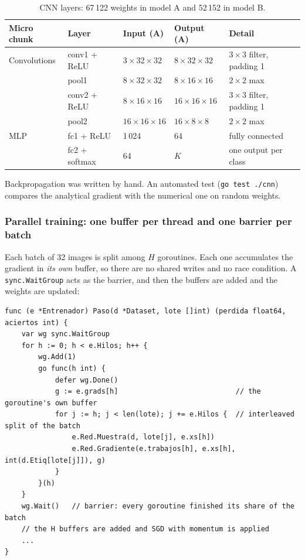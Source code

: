 \documentclass[10pt,a4paper]{article}
\begin{document}
\begin{table}[H]
\centering
\small
\begin{tabular}{lllll}
\toprule
\textbf{Micro chunk} & \textbf{Layer} & \textbf{Input (A)} & \textbf{Output (A)} & \textbf{Detail} \\
\midrule
Convolutions & conv1 + ReLU & $3 \times 32 \times 32$ & $8 \times 32 \times 32$ & $3 \times 3$ filter, padding 1 \\
 & pool1 & $8 \times 32 \times 32$ & $8 \times 16 \times 16$ & $2 \times 2$ max \\
 & conv2 + ReLU & $8 \times 16 \times 16$ & $16 \times 16 \times 16$ & $3 \times 3$ filter, padding 1 \\
 & pool2 & $16 \times 16 \times 16$ & $16 \times 8 \times 8$ & $2 \times 2$ max \\
MLP & fc1 + ReLU & 1\,024 & 64 & fully connected \\
 & fc2 + softmax & 64 & $K$ & one output per class \\
\bottomrule
\end{tabular}
\caption{CNN layers: 67\,122 weights in model A and 52\,152 in model B.}
\label{tab:cnn}
\end{table}

Backpropagation was written by hand. An automated test (\texttt{go test ./cnn}) compares the
analytical gradient with the numerical one on random weights.

\subsubsection{Parallel training: one buffer per thread and one barrier per batch}

Each batch of 32 images is split among $H$ goroutines. Each one accumulates the gradient in \emph{its
own} buffer, so there are no shared writes and no race condition. A \texttt{sync.WaitGroup} acts as the
barrier, and then the buffers are added and the weights are updated:

\begin{lstlisting}[language={}]
func (e *Entrenador) Paso(d *Dataset, lote []int) (perdida float64, aciertos int) {
    var wg sync.WaitGroup
    for h := 0; h < e.Hilos; h++ {
        wg.Add(1)
        go func(h int) {
            defer wg.Done()
            g := e.grads[h]                            // the goroutine's own buffer
            for j := h; j < len(lote); j += e.Hilos {  // interleaved split of the batch
                e.Red.Muestra(d, lote[j], e.xs[h])
                e.Red.Gradiente(e.trabajos[h], e.xs[h], int(d.Etiq[lote[j]]), g)
            }
        }(h)
    }
    wg.Wait()   // barrier: every goroutine finished its share of the batch
    // the H buffers are added and SGD with momentum is applied
    ...
}
\end{lstlisting}
\end{document}
